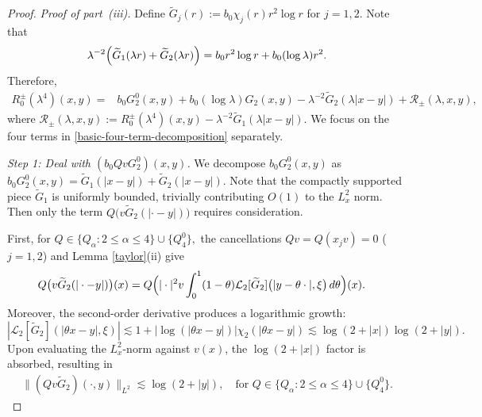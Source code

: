 \documentclass[reqno]{amsart}
\numberwithin{equation}{section}
\begin{document}
\begin{proof}
	\medskip
	
	\textit{Proof of part~{\rm (iii)}.}
	Define
	$
	\widetilde{G}_j(r)
	:=
	b_0\chi_j(r)r^2\log r
$ for $	 j=1,2.$
	Note that
	$$
	\lambda^{-2}
	\Bigl(
	\widetilde{G}_1(\lambda r)
	+
	\widetilde{G}_2(\lambda r)
	\Bigr)
	=
	b_0r^2\log r
	+
	b_0(\log\lambda)r^2.
	$$
	Therefore,
	\begin{align}
		R_0^\pm(\lambda^4)(x,y)
		={}&
		b_0G_2^0(x,y)
		+
		b_0(\log\lambda)G_2(x,y)
	-
		\lambda^{-2}
		\widetilde{G}_2(\lambda|x-y|)
		+
		\mathcal{R}_\pm(\lambda,x,y),
		\label{basic-four-term-decomposition}
	\end{align}
	where
	$
		\mathcal{R}_\pm(\lambda,x,y)
		:=
		R_0^\pm(\lambda^4)(x,y)
		-
		\lambda^{-2}
		\widetilde{G}_1(\lambda|x-y|).
$
	We focus on  the four terms in
	\eqref{basic-four-term-decomposition} separately.
	
	\medskip
	
	\textit{Step 1: Deal with $(b_0QvG_2^0)(x,y)$.}
We decompose $b_0G_2^0(x,y)$ as 
	$
	b_0G_2^0(x,y)
	=
	\widetilde{G}_1(|x-y|)
	+
	\widetilde{G}_2(|x-y|).
	$
Note that  the compactly supported piece $\widetilde{G}_1$ is uniformly bounded,  trivially contributing ${O}(1)$ to the $L^2_x$ norm. Then  only the
	term
	$
	Q
	\bigl(
	v\widetilde{G}_2(|\cdot-y|)
	\bigr)
	$
	requires consideration.
	
First, for
	$
	Q
	\in
	\{Q_\alpha:2\leq\alpha\leq4\}
	\cup
	\{Q_4^0\},
	$
	the cancellations
	$
	Qv=Q(x_jv)=0
	$ ($j=1,2$)
	and Lemma \ref{taylor}(ii) give
	\begin{align}
		&
		Q
		\bigl(
		v\widetilde{G}_2(|\cdot-y|)
		\bigr)(x)
	=
		Q
		\Bigl(
		|\cdot|^2v
		\int_0^1
		(1-\theta)
		\mathcal{L}_2[\widetilde{G}_2]
		\bigl(
		|y-\theta\cdot|,
		\xi
		\bigr)
		\,d\theta
		\Bigr)(x).
		\label{QvG20-1}
	\end{align}
	 Moreover,
	the second-order derivative produces a logarithmic growth:
	$$
	\left|\mathcal{L}_2[\widetilde{G}_2](|\theta x-y|,\xi)\right| \lesssim 1 + |\log(|\theta x-y|)| \chi_2(|\theta x-y|) \lesssim \log(2+|x|)\log(2+|y|).
	$$
	Upon evaluating the $L^2_x$-norm against $v(x)$, the $\log(2+|x|)$ factor is absorbed, resulting in \begin{align}\label{static-log-bound}
		\|(Q v \widetilde{G}_2)(\cdot,y)\|_{L^2} \lesssim \log(2+|y|), \quad \text{for } 	Q
		\in
		\{Q_\alpha:2\leq\alpha\leq4\}
		\cup
		\{Q_4^0\}.\end{align}
	
	
	

\end{proof}
\end{document}

